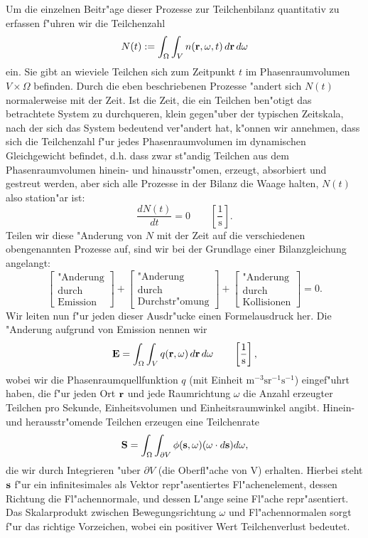 	Um die einzelnen Beitr"age dieser Prozesse zur Teilchenbilanz quantitativ zu erfassen f"uhren wir die Teilchenzahl $$N(t):=\int_\Omega \int_V n(\mathbf{r},\omega,t)\,d\mathbf{r}\,d\omega$$ ein. Sie gibt an wieviele Teilchen sich zum Zeitpunkt $t$ im Phasenraumvolumen $V \times \Omega$ befinden. Durch die eben beschriebenen Prozesse "andert sich $N(t)$ normalerweise mit der Zeit. Ist die Zeit, die ein Teilchen ben"otigt das betrachtete System zu durchqueren, klein gegen"uber der typischen Zeitskala, nach der sich das System bedeutend ver"andert hat, k"onnen wir annehmen, dass sich die Teilchenzahl f"ur jedes Phasenraumvolumen im dynamischen Gleichgewicht befindet, d.h. dass zwar st"andig Teilchen aus dem Phasenraumvolumen hinein- und hinausstr"omen, erzeugt, absorbiert und gestreut werden, aber sich alle Prozesse in der Bilanz die Waage halten, $N(t)$ also station"ar ist:$$\frac{dN(t)}{dt}=0\qquad\left[\frac{1}{\text{s}}\right].$$ Teilen wir diese "Anderung von $N$ mit der Zeit auf die verschiedenen obengenannten Prozesse auf, sind wir bei der Grundlage einer Bilanzgleichung angelangt:$$\begin{bmatrix}\text{"Anderung}\\ \text{durch}\\ \text{Emission}\end{bmatrix}+\begin{bmatrix}\text{"Anderung}\\ \text{durch}\\ \text{Durchstr"omung}\end{bmatrix}+\begin{bmatrix}\text{"Anderung}\\ \text{durch}\\ \text{Kollisionen}\end{bmatrix}=0.$$ Wir leiten nun f"ur jeden dieser Ausdr"ucke einen Formelausdruck her.
	Die "Anderung aufgrund von Emission nennen wir $$\mathbf{E}=\int_\Omega \int_V q(\mathbf{r},\omega)\,d\mathbf{r}\,d\omega\qquad\left[\frac{1}{\text{s}}\right],$$ wobei wir die Phasenraumquellfunktion $q$ (mit Einheit $\text{m}^{-3}\text{sr}^{-1}\text{s}^{-1}$) eingef"uhrt haben, die f"ur jeden Ort $\mathbf{r}$ und jede Raumrichtung $\omega$ die Anzahl erzeugter Teilchen pro Sekunde, Einheitsvolumen und Einheitsraumwinkel angibt. Hinein- und herausstr"omende Teilchen erzeugen eine Teilchenrate
	$$\mathbf{S}=\int_\Omega \int_{\partial V} \phi(\mathbf{s},\omega)(\omega \cdot d\mathbf{s})d\omega,$$
	die wir durch Integrieren "uber $\partial V$ (die Oberfl"ache von V) erhalten. Hierbei steht $\mathbf{s}$ f"ur ein infinitesimales als Vektor repr"asentiertes Fl"achenelement, dessen Richtung die Fl"achennormale, und dessen L"ange seine Fl"ache repr"asentiert. Das Skalarprodukt zwischen Bewegungsrichtung $\omega$ und Fl"achennormalen sorgt f"ur das richtige Vorzeichen, wobei ein positiver Wert Teilchenverlust bedeutet.
